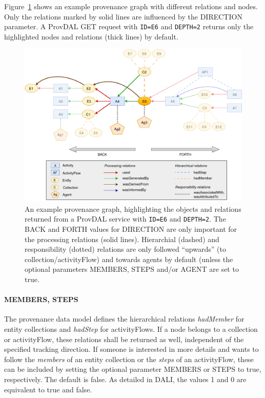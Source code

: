 Figure~\ref{fig:provenance-graph-example} shows an example provenance graph with different relations and nodes. Only the relations marked by solid lines are influenced by the DIRECTION parameter. A ProvDAL GET request with \texttt{ID=E6} and \texttt{DEPTH=2} returns only the highlighted nodes and relations (thick lines) by default.

\begin{figure}[h]
\centering
\includegraphics[width=1.0\textwidth]{provenance-graph-example-depth2.pdf}
\caption{An example provenance graph, highlighting the objects and relations returned from a ProvDAL service with \texttt{ID=E6} and \texttt{DEPTH=2}. The BACK and FORTH values for DIRECTION are only important for the processing relations (solid lines). Hierarchial (dashed) and responsibility (dotted) relations are only followed ``upwards'' (to collection/activityFlow) and towards agents by default (unless the optional parameters MEMBERS, STEPS and/or AGENT are set to true.}
\label{fig:provenance-graph-example}
\end{figure}




\paragraph{MEMBERS, STEPS}
The provenance data model defines the hierarchical relations \emph{hadMember} for entity collections and \emph{hadStep} for activityFlows. If a node belongs to a collection or activityFlow, these relations shall be returned as well, independent of the specified tracking direction.
If someone is interested in more details and wants to follow the \emph{members} of an entity collection or the \emph{steps} of an activityFlow, these can be included by setting the optional parameter MEMBERS or STEPS to true, respectively. The default is false. As detailed in DALI, the values 1 and 0 are equivalent to true and false.

